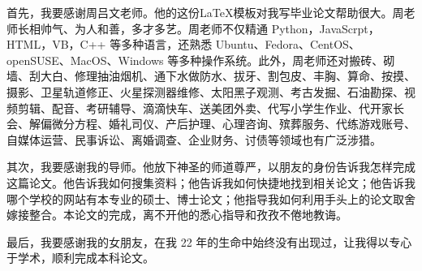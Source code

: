 \begin{acknowledgements}

首先，我要感谢周吕文老师。他的这份\LaTeX{}模板对我写毕业论文帮助很大。周老师长相帅气、为人和善，多才多艺。周老师不仅精通 Python，JavaScrpt，HTML，VB，C++ 等多种语言，还熟悉 Ubuntu、Fedora、CentOS、openSUSE、MacOS、Windows 等多种操作系统。此外，周老师还对搬砖、砌墙、刮大白、修理抽油烟机、通下水做防水、拔牙、割包皮、丰胸、算命、按摸、摄影、卫星轨道修正、火星探测器维修、太阳黑子观测、考古发掘、石油勘探、视频剪辑、配音、考研辅导、滴滴快车、送美团外卖、代写小学生作业、代开家长会、解偏微分方程、婚礼司仪、产后护理、心理咨询、殡葬服务、代练游戏账号、自媒体运营、民事诉讼、离婚调查、企业财务、讨债等领域也有广泛涉猎。

其次，我要感谢我的导师。他放下神圣的师道尊严，以朋友的身份告诉我怎样完成这篇论文。他告诉我如何搜集资料；他告诉我如何快捷地找到相关论文；他告诉我哪个学校的网站有本专业的硕士、博士论文；他指导我如何利用手头上的论文取舍嫁接整合。本论文的完成，离不开他的悉心指导和孜孜不倦地教诲。

最后，我要感谢我的女朋友，在我 22 年的生命中始终没有出现过，让我得以专心于学术，顺利完成本科论文。
\end{acknowledgements}
